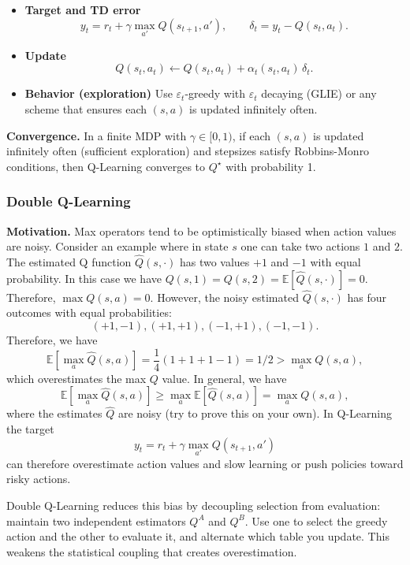 \documentclass[
]{book}
\theoremstyle{definition}
\theoremstyle{definition}
\theoremstyle{definition}
\theoremstyle{definition}
\theoremstyle{remark}
\begin{document}
\begin{itemize}
\item
  \textbf{Target and TD error}
  \[
  y_t = r_{t} + \gamma \max_{a'} Q(s_{t+1}, a'), \qquad
  \delta_t = y_t - Q(s_t, a_t).
  \]
\item
  \textbf{Update}
  \[
  Q(s_t, a_t) \leftarrow Q(s_t, a_t) + \alpha_t(s_t,a_t)\, \delta_t.
  \]
\item
  \textbf{Behavior (exploration)}
  Use \(\varepsilon_t\)-greedy with \(\varepsilon_t\) decaying (GLIE) or any scheme that ensures each \((s,a)\) is updated infinitely often.
\end{itemize}

\textbf{Convergence.} In a finite MDP with \(\gamma \in [0,1)\), if each \((s,a)\) is updated infinitely often (sufficient exploration) and stepsizes satisfy Robbins-Monro conditions, then Q-Learning converges to \(Q^\star\) with probability 1.

\subsubsection{Double Q-Learning}\label{double-q-learning}

\textbf{Motivation.} Max operators tend to be optimistically biased when action values are noisy. Consider an example where in state \(s\) one can take two actions \(1\) and \(2\). The estimated Q function \(\hat{Q}(s, \cdot)\) has two values \(+1\) and \(-1\) with equal probability. In this case we have \(Q(s,1) = Q(s,2) = \mathbb{E}[\hat{Q}(s,\cdot)] = 0\). Therefore, \(\max Q(s,a) = 0\). However, the noisy estimated \(\hat{Q}(s,\cdot)\) has four outcomes with equal probabilities:
\[
(+1,-1), (+1,+1), (-1, +1), (-1,-1).
\]
Therefore, we have
\[
\mathbb{E}[\max_a \hat{Q}(s,a)] = \frac{1}{4} (1 + 1 + 1 -1) = 1/2 > \max_a Q(s,a),
\]
which overestimates the max \(Q\) value. In general, we have
\[
\mathbb{E}[\max_a \hat{Q}(s,a)] \geq \max_a \mathbb{E} [\hat{Q}(s,a)] = \max_a Q(s,a),
\]
where the estimates \(\hat{Q}\) are noisy (try to prove this on your own).
In Q-Learning the target
\[
y_t = r_{t} + \gamma \max_{a'} Q(s_{t+1}, a')
\]
can therefore overestimate action values and slow learning or push policies toward risky actions.

Double Q-Learning reduces this bias by decoupling selection from evaluation: maintain two independent estimators \(Q^A\) and \(Q^B\). Use one to select the greedy action and the other to evaluate it, and alternate which table you update. This weakens the statistical coupling that creates overestimation.
\end{document}
